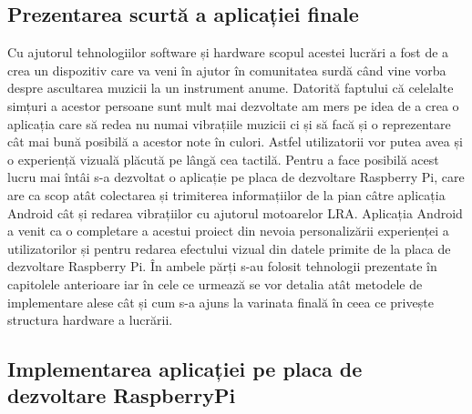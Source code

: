 \documentclass[../IoMusT.tex]{subfiles}
\begin{document}
\subsection{Prezentarea scurtă a aplicației finale}
Cu ajutorul tehnologiilor software și hardware scopul acestei lucrări a fost de a crea un dispozitiv care va veni în ajutor în comunitatea surdă când vine vorba despre ascultarea muzicii la un instrument anume. Datorită faptului că celelalte simțuri a acestor persoane sunt mult mai dezvoltate am mers pe idea de a crea o aplicația care să redea nu numai vibrațiile muzicii ci și să facă și o reprezentare cât mai bună posibilă a acestor note în culori. Astfel utilizatorii vor putea avea și o experiență vizuală plăcută pe lângă cea tactilă. Pentru a face posibilă acest lucru mai întâi s-a dezvoltat o aplicație pe placa de dezvoltare Raspberry Pi, care are ca scop atât colectarea și trimiterea informațiilor de la pian câtre aplicația Android cât și redarea vibrațiilor cu ajutorul motoarelor LRA. Aplicația Android a venit ca o completare a acestui proiect din nevoia personalizării experienței a utilizatorilor și pentru redarea efectului vizual din datele primite de la placa de dezvoltare Raspberry Pi. În ambele părți s-au folosit tehnologii prezentate în capitolele anterioare iar în cele ce urmează se vor detalia atât metodele de implementare alese cât și cum s-a ajuns la varinata finală în ceea ce privește structura hardware a lucrării.
\subsection{Implementarea aplicației pe placa de dezvoltare RaspberryPi}
\end{document}
